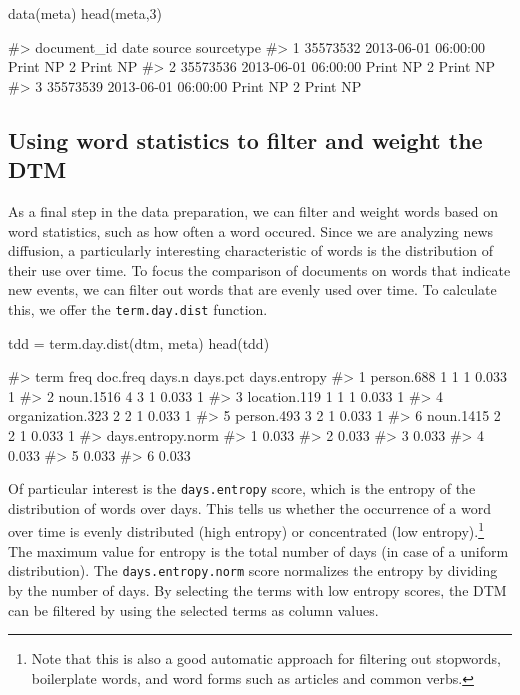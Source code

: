 \begin{Schunk}
\begin{Sinput}
data(meta)
head(meta,3)
\end{Sinput}
\begin{Soutput}
#>   document_id                date     source sourcetype
#> 1    35573532 2013-06-01 06:00:00 Print NP 2   Print NP
#> 2    35573536 2013-06-01 06:00:00 Print NP 2   Print NP
#> 3    35573539 2013-06-01 06:00:00 Print NP 2   Print NP
\end{Soutput}
\end{Schunk}

\subsection{Using word statistics to filter and weight the DTM}

As a final step in the data preparation, we can filter and weight words
based on word statistics, such as how often a word occured. Since we are
analyzing news diffusion, a particularly interesting characteristic of
words is the distribution of their use over time. To focus the
comparison of documents on words that indicate new events, we can filter
out words that are evenly used over time. To calculate this, we offer
the \texttt{term.day.dist} function.

\begin{Schunk}
\begin{Sinput}
tdd = term.day.dist(dtm, meta)
head(tdd)
\end{Sinput}
\begin{Soutput}
#>               term freq doc.freq days.n days.pct days.entropy
#> 1       person.688    1        1      1    0.033            1
#> 2        noun.1516    4        3      1    0.033            1
#> 3     location.119    1        1      1    0.033            1
#> 4 organization.323    2        2      1    0.033            1
#> 5       person.493    3        2      1    0.033            1
#> 6        noun.1415    2        2      1    0.033            1
#>   days.entropy.norm
#> 1             0.033
#> 2             0.033
#> 3             0.033
#> 4             0.033
#> 5             0.033
#> 6             0.033
\end{Soutput}
\end{Schunk}

Of particular interest is the \texttt{days.entropy} score, which is the
entropy of the distribution of words over days. This tells us whether
the occurrence of a word over time is evenly distributed (high entropy)
or concentrated (low entropy).\footnote{Note that this is also a good
  automatic approach for filtering out stopwords, boilerplate words, and
  word forms such as articles and common verbs.} The maximum value for
entropy is the total number of days (in case of a uniform distribution).
The \texttt{days.entropy.norm} score normalizes the entropy by dividing
by the number of days. By selecting the terms with low entropy scores,
the DTM can be filtered by using the selected terms as column values.

